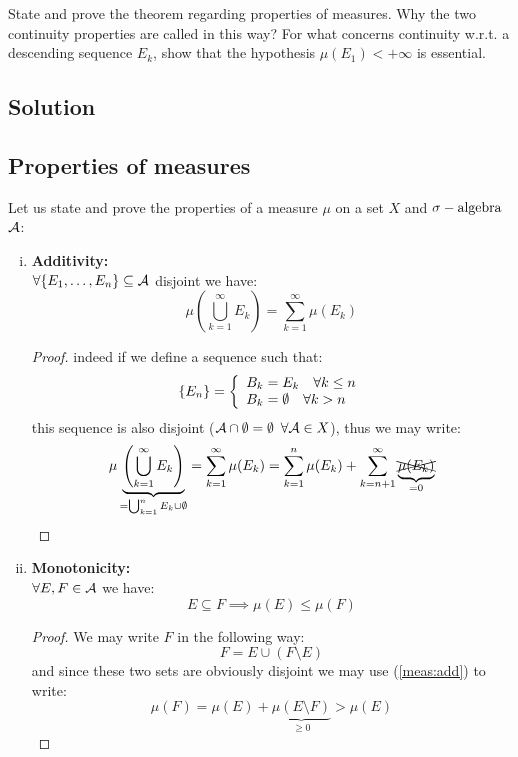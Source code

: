 \question
State and prove the theorem regarding properties of measures. Why the two continuity properties
are called in this way? For what concerns continuity w.r.t. a descending sequence ${E_k}$, show that
the hypothesis $\mu(E_1) < +\infty$ is essential.

\subsection*{Solution}
\subsection{Properties of measures}
Let us state and prove the properties of a measure $\mu$ on a set $X$ and $\sigma-\text{algebra}$ $\mathcal{A}$:
\begin{enumerate}[i)]
    \item \label{meas:add} \textbf{Additivity:} \\
    $\forall \{ E_1, \dots, E_n \} \subseteq \mathcal{A}$ disjoint we have:
    \[
        \mu\left( \bigcup_{k=1}^{\infty} E_k \right) = \sum_{k=1}^{\infty} \mu(E_k)
    \]
    \begin{proof}
    indeed if we define a sequence such that:
    \[
        \{ E_n \} = \left\{ \begin{array}{l}
            B_k = E_k \quad \forall k \leq n\\
            B_k = \emptyset \quad \forall k > n
        \end{array} \right.
    \]
    this sequence is also disjoint ($\mathcal{A}\cap\emptyset = \emptyset$ $\forall \mathcal{A}\in X$), thus we may write:
    \[
        \mu \underbrace{ \left( \bigcup_{k=1}^{\infty} E_k \right) }_{=\bigcup_{k=1}^{n} E_k \cup \emptyset}
         = \sum_{k=1}^{\infty} \mu(E_k) = \sum_{k=1}^{n} \mu(E_k) + \sum_{k=n+1}^{\infty} \underbrace{\xcancel{\mu(E_k)}}_{=0}
    \]
    \end{proof}

    \item \label{meas:mono} \textbf{Monotonicity:} \\
    $\forall E,F \in \mathcal{A}$ we have:
    \[
        E\subseteq F \implies \mu(E) \leq \mu(F)    
    \]
    \begin{proof}
    We may write $F$ in the following way:
    \[
        F=E\cup (F \setminus E) 
    \]
    and since these two sets are obviously disjoint we may use (\ref{meas:add}) to write:
    \[
        \mu(F) = \mu(E)+\underbrace{\mu(E \setminus F)}_{\geq 0} > \mu(E)
    \]
    \end{proof}
    

\end{enumerate}
